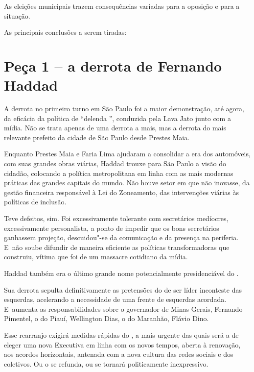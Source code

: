  

As eleições municipais trazem consequências variadas para a oposição e
para a situação.

As principais conclusões a serem tiradas:

\section{Peça 1 -- a derrota de Fernando Haddad}

A derrota no primeiro turno em São Paulo foi a maior demonstração, até
agora, da eficácia da política de ``delenda '', conduzida pela Lava
Jato junto com a mídia. Não se trata apenas de uma derrota a mais, mas a
derrota do mais relevante prefeito da cidade de São Paulo desde Prestes
Maia.

Enquanto Prestes Maia e Faria Lima ajudaram a consolidar a era dos
automóveis, com suas grandes obras viárias, Haddad trouxe para São Paulo
a visão do cidadão, colocando a política metropolitana em linha com as
mais modernas práticas das grandes capitais do mundo. Não houve setor em
que não inovasse, da gestão financeira responsável à Lei do Zoneamento,
das intervenções viárias às políticas de inclusão.

Teve defeitos, sim. Foi excessivamente tolerante com secretários
medíocres, excessivamente personalista, a ponto de impedir que os bons
secretários ganhassem projeção, descuidou"-se da comunicação e da
presença na periferia. E~não soube difundir de maneira eficiente as
políticas transformadoras que construiu, vítima que foi de um massacre
cotidiano da mídia.

Haddad também era o último grande nome potencialmente presidenciável do
.

Sua derrota sepulta definitivamente as pretensões do  de ser líder
inconteste das esquerdas, acelerando a necessidade de uma frente de
esquerdas acordada. E~aumenta as responsabilidades sobre o governador de
Minas Gerais, Fernando Pimentel, o do Piauí, Wellington Dias, o do
Maranhão, Flávio Dino.

Esse rearranjo exigirá medidas rápidas do , a mais urgente das quais
será a de eleger uma nova Executiva em linha com os novos tempos, aberta
à renovação, aos acordos horizontais, antenada com a nova cultura das
redes sociais e dos coletivos. Ou o  se refunda, ou se tornará
politicamente inexpressivo.

